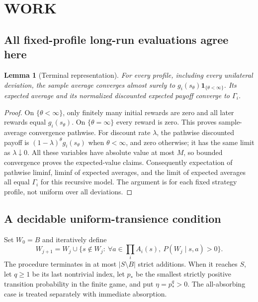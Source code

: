\documentclass[11pt,a4paper]{article}
\newcommand{\ind}{\mathbf 1}
\newtheorem{lemma}[theorem]{Lemma}
\theoremstyle{definition}
\theoremstyle{remark}
\begin{document}
\section{WORK}
\subsection{All fixed-profile long-run evaluations agree here}
\begin{lemma}[Terminal representation]
For every profile, including every unilateral deviation, the sample average converges almost surely to $g_i(s_\theta)\ind_{\{\theta<\infty\}}$. Its expected average and its normalized discounted expected payoff converge to $\Gamma_i$.
\end{lemma}
\begin{proof}
On $\{\theta<\infty\}$, only finitely many initial rewards are zero and all later rewards equal $g_i(s_\theta)$. On $\{\theta=\infty\}$ every reward is zero. This proves sample-average convergence pathwise. For discount rate $\lambda$, the pathwise discounted payoff is $(1-\lambda)^\theta g_i(s_\theta)$ when $\theta<\infty$, and zero otherwise; it has the same limit as $\lambda\downarrow0$. All these variables have absolute value at most $M$, so bounded convergence proves the expected-value claims. Consequently expectation of pathwise liminf, liminf of expected averages, and the limit of expected averages all equal $\Gamma_i$ for this recursive model. The argument is for each fixed strategy profile, not uniform over all deviations.
\end{proof}

\subsection{A decidable uniform-transience condition}
Set $W_0=B$ and iteratively define
\[
 W_{j+1}=W_j\cup
 \{s\notin W_j:\ \forall a\in\prod_iA_i(s),\ P(W_j\mid s,a)>0\}.
\]
The procedure terminates in at most $|S\setminus B|$ strict additions. When it reaches $S$, let $q\geq1$ be its last nontrivial index, let $p_*$ be the smallest strictly positive transition probability in the finite game, and put $\eta=p_*^q>0$. The all-absorbing case is treated separately with immediate absorption.
\end{document}
